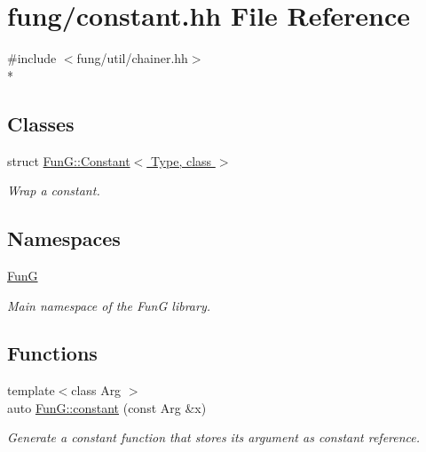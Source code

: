 \hypertarget{constant_8hh}{\section{fung/constant.hh File Reference}
\label{constant_8hh}
}
{\ttfamily \#include $<$fung/util/chainer.\-hh$>$}\\*
\subsection*{Classes}
\begin{DoxyCompactItemize}
\item 
struct \hyperlink{structFunG_1_1Constant}{Fun\-G\-::\-Constant$<$ Type, class $>$}
\begin{DoxyCompactList}\small\item\em Wrap a constant. \end{DoxyCompactList}\end{DoxyCompactItemize}
\subsection*{Namespaces}
\begin{DoxyCompactItemize}
\item 
\hyperlink{namespaceFunG}{Fun\-G}
\begin{DoxyCompactList}\small\item\em Main namespace of the Fun\-G library. \end{DoxyCompactList}\end{DoxyCompactItemize}
\subsection*{Functions}
\begin{DoxyCompactItemize}
\item 
{\footnotesize template$<$class Arg $>$ }\\auto \hyperlink{namespaceFunG_a65c509062b62b3303268cabc97b75a65}{Fun\-G\-::constant} (const Arg \&x)
\begin{DoxyCompactList}\small\item\em Generate a constant function that stores its argument as constant reference. \end{DoxyCompactList}\end{DoxyCompactItemize}
